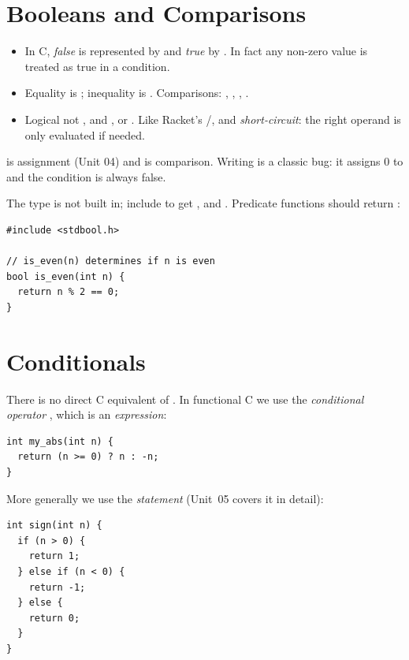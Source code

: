 \section{Booleans and Comparisons}

\begin{itemize}
  \item In C, \emph{false} is represented by  and \emph{true} by . In fact any
    non-zero value is treated as true in a condition.
  \item Equality is \code{==}; inequality is \code{!=}. Comparisons: \code{<}, \code{<=},
    \code{>}, \code{>=}.
  \item Logical not \code{!}, and \code{\&\&}, or \code{||}. Like Racket's /,
    \code{\&\&} and \code{||} \emph{short-circuit}: the right operand is only evaluated if needed.
\end{itemize}

\begin{important}[\code{=} vs \code{==}]
\code{=} is assignment (Unit 04) and \code{==} is comparison. Writing  is a
classic bug: it assigns 0 to  and the condition is always false.
\end{important}

The  type is not built in; include  to get ,
 and . Predicate functions should return :
\begin{lstlisting}[style=c]
#include <stdbool.h>

// is_even(n) determines if n is even
bool is_even(int n) {
  return n % 2 == 0;
}
\end{lstlisting}

\section{Conditionals}

There is no direct C equivalent of . In functional C we use the
\emph{conditional operator} , which is an \emph{expression}:
\begin{lstlisting}[style=c]
int my_abs(int n) {
  return (n >= 0) ? n : -n;
}
\end{lstlisting}
More generally we use the  \emph{statement} (Unit~05 covers it in detail):
\begin{lstlisting}[style=c]
int sign(int n) {
  if (n > 0) {
    return 1;
  } else if (n < 0) {
    return -1;
  } else {
    return 0;
  }
}
\end{lstlisting}

